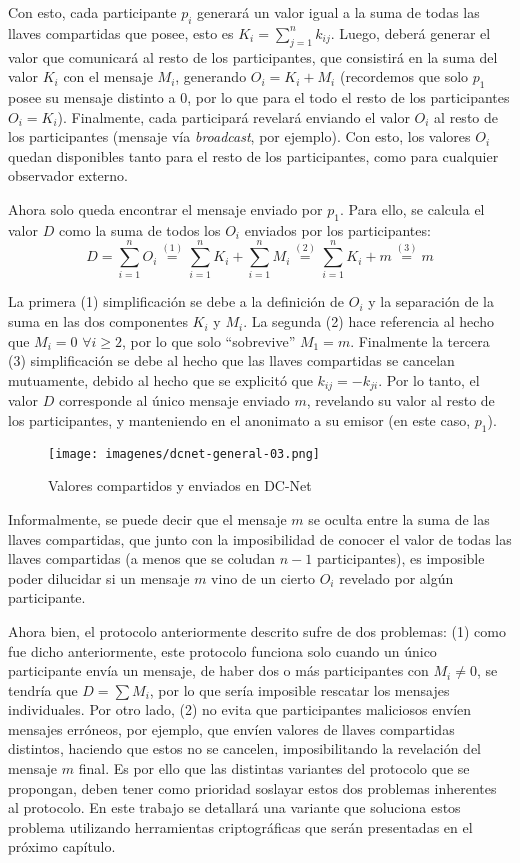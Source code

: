 Con esto, cada participante $p_i$ generará un valor igual a la suma de todas las llaves compartidas que posee, esto es $K_i = \sum_{j=1}^n k_{ij}$. 
Luego, deberá generar el valor que comunicará al resto de los participantes, que consistirá en la suma del valor $K_i$ con el mensaje $M_i$, 
generando $O_i = K_i + M_i$ (recordemos que solo $p_1$ posee su mensaje distinto a 0, por lo que para el todo el resto de los participantes $O_i = K_i$). 
Finalmente, cada participará revelará enviando el valor $O_i$ al resto de los participantes (mensaje vía \emph{broadcast}, por ejemplo). Con esto, los 
valores $O_i$ quedan disponibles tanto para el resto de los participantes, como para cualquier observador externo.

Ahora solo queda encontrar el mensaje enviado por $p_1$. Para ello, se calcula el valor $D$ como la suma de todos los $O_i$ enviados por los 
participantes: $$D = \sum_{i=1}^n O_i \overset{(1)}{=} \sum_{i=1}^n K_i + \sum_{i=1}^n M_i \overset{(2)}{=} \sum_{i=1}^n K_i + m \overset{(3)}{=} m$$

La primera (1) simplificación se debe a la definición de $O_i$ y la separación de la suma en las dos componentes $K_i$ y $M_i$. La segunda 
(2) hace referencia al hecho que $M_i = 0$ $\forall i \geq 2$, por lo que solo ``sobrevive'' $M_1 = m$. Finalmente la tercera (3) simplificación 
se debe al hecho que las llaves compartidas se cancelan mutuamente, debido al hecho que se explicitó que $k_{ij} = -k_{ji}$. Por lo tanto, el 
valor $D$ corresponde al único mensaje enviado $m$, revelando su valor al resto de los participantes, y manteniendo en el anonimato a su emisor 
(en este caso, $p_1$).

\begin{figure}[H]
  \centering
    \texttt{[image: imagenes/dcnet-general-03.png]}
  \caption{Valores compartidos y enviados en DC-Net}
\end{figure}

Informalmente, se puede decir que el mensaje $m$ se oculta entre la suma de las llaves compartidas, que junto con la imposibilidad de conocer el 
valor de todas las llaves compartidas (a menos que se coludan $n-1$ participantes), es imposible poder dilucidar si un mensaje $m$ vino de un 
cierto $O_i$ revelado por algún participante.

Ahora bien, el protocolo anteriormente descrito sufre de dos problemas: (1) como fue dicho anteriormente, este protocolo funciona solo cuando un 
único participante envía un mensaje, de haber dos o más participantes con $M_i \neq 0$, se tendría que $D = \sum M_i$, por lo que sería imposible 
rescatar los mensajes individuales. Por otro lado, (2) no evita que participantes maliciosos envíen mensajes erróneos, por ejemplo, que envíen 
valores de llaves compartidas distintos, haciendo que estos no se cancelen, imposibilitando la revelación del mensaje $m$ final. Es por ello que 
las distintas variantes del protocolo que se propongan, deben tener como prioridad soslayar estos dos problemas inherentes al protocolo. En este 
trabajo se detallará una variante que soluciona estos problema utilizando herramientas criptográficas que serán presentadas en el próximo capítulo.

